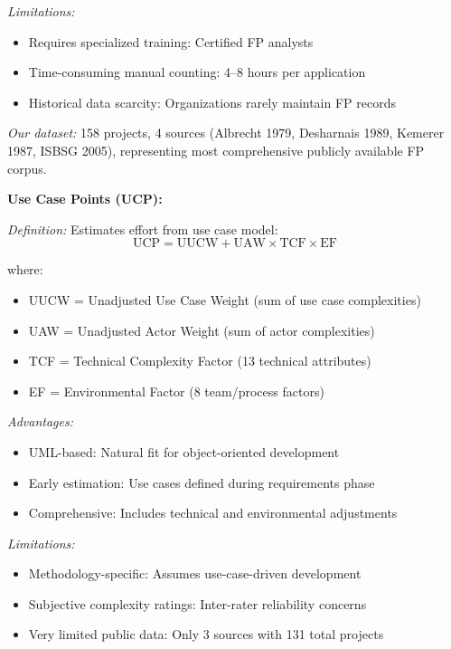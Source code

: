 \documentclass[11pt,a4paper]{article}
\begin{document}
\textit{Limitations:}
\begin{itemize}
    \item Requires specialized training: Certified FP analysts
    \item Time-consuming manual counting: 4--8 hours per application
    \item Historical data scarcity: Organizations rarely maintain FP records
\end{itemize}

\textit{Our dataset:} 158 projects, 4 sources (Albrecht 1979, Desharnais 1989, Kemerer 1987, ISBSG 2005), representing most comprehensive publicly available FP corpus.

\textbf{Use Case Points (UCP):}

\textit{Definition:} Estimates effort from use case model:
\begin{equation}
\text{UCP} = \text{UUCW} + \text{UAW} \times \text{TCF} \times \text{EF}
\end{equation}

where:
\begin{itemize}
    \item UUCW = Unadjusted Use Case Weight (sum of use case complexities)
    \item UAW = Unadjusted Actor Weight (sum of actor complexities)
    \item TCF = Technical Complexity Factor (13 technical attributes)
    \item EF = Environmental Factor (8 team/process factors)
\end{itemize}

\textit{Advantages:}
\begin{itemize}
    \item UML-based: Natural fit for object-oriented development
    \item Early estimation: Use cases defined during requirements phase
    \item Comprehensive: Includes technical and environmental adjustments
\end{itemize}

\textit{Limitations:}
\begin{itemize}
    \item Methodology-specific: Assumes use-case-driven development
    \item Subjective complexity ratings: Inter-rater reliability concerns
    \item Very limited public data: Only 3 sources with 131 total projects
\end{itemize}
\end{document}
